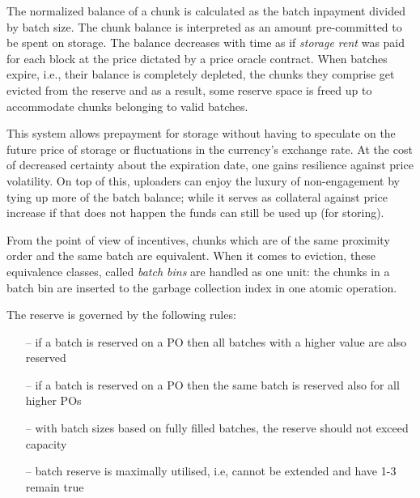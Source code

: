 

The normalized balance of a chunk is calculated as the batch inpayment divided by batch size. The chunk balance is interpreted as an amount pre-committed to be spent on storage. The balance decreases with time as if \emph{storage rent} was paid for each block at the price dictated by a price oracle contract.  
When batches expire, i.e., their balance is completely depleted, the chunks they comprise get evicted from the reserve and as a result, some reserve space is freed up to accommodate chunks belonging to valid batches.

This system allows prepayment for storage without having to speculate on the future price of storage or fluctuations in the currency's exchange rate. At the cost of decreased certainty about the expiration date, one gains resilience against price volatility. On top of this, uploaders can enjoy the luxury of non-engagement by tying up more of the batch balance; while it serves as collateral against price increase if that does not happen the funds can still be used up (for storing).

From the point of view of incentives, chunks which are of the same proximity order and the same batch are equivalent. When it comes to eviction, these equivalence classes, called \emph{batch bins} are handled as one unit: the chunks in a batch bin are inserted to the garbage collection index in one atomic operation. 

The reserve is governed by the following rules:
\begin{itemize}[noitemsep]
    \item[--] if a batch is reserved on a PO then all batches with a higher value are also reserved
    \item[--] if a batch is reserved on a PO then the same batch is reserved also for all higher POs 
    \item[--] with batch sizes based on fully filled batches, the reserve should not exceed capacity
    \item[--] batch reserve is maximally utilised, i.e, cannot be extended and have 1-3 remain true
\end{itemize}

